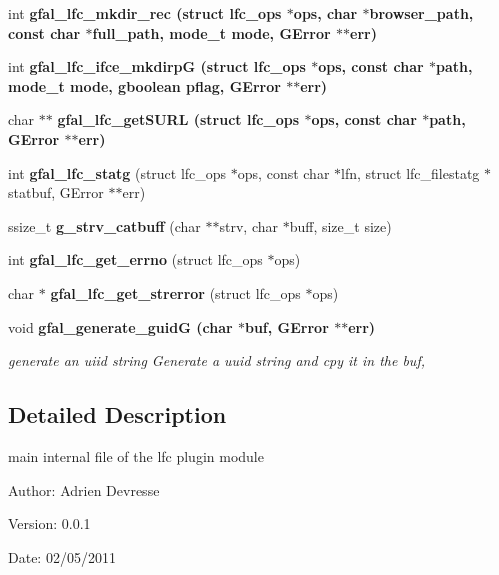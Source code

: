 \begin{CompactItemize}
\item 
int \bf{gfal\_\-lfc\_\-mkdir\_\-rec} (struct lfc\_\-ops $\ast$ops, char $\ast$browser\_\-path, const char $\ast$full\_\-path, mode\_\-t mode, GError $\ast$$\ast$err)
\item 
int \bf{gfal\_\-lfc\_\-ifce\_\-mkdirp\-G} (struct lfc\_\-ops $\ast$ops, const char $\ast$path, mode\_\-t mode, gboolean pflag, GError $\ast$$\ast$err)
\item 
char $\ast$$\ast$ \bf{gfal\_\-lfc\_\-get\-SURL} (struct lfc\_\-ops $\ast$ops, const char $\ast$path, GError $\ast$$\ast$err)
\item 
int \textbf{gfal\_\-lfc\_\-statg} (struct lfc\_\-ops $\ast$ops, const char $\ast$lfn, struct lfc\_\-filestatg $\ast$statbuf, GError $\ast$$\ast$err)\label{lfc__ifce__ng_8c_220714510c3f197e656ddea9f04ffec3}

\item 
ssize\_\-t \textbf{g\_\-strv\_\-catbuff} (char $\ast$$\ast$strv, char $\ast$buff, size\_\-t size)\label{lfc__ifce__ng_8c_bc04cd8d7342170700f02f6297fc4105}

\item 
int \textbf{gfal\_\-lfc\_\-get\_\-errno} (struct lfc\_\-ops $\ast$ops)\label{lfc__ifce__ng_8c_caa53981228e722b2175cfd7b4ca051c}

\item 
char $\ast$ \textbf{gfal\_\-lfc\_\-get\_\-strerror} (struct lfc\_\-ops $\ast$ops)\label{lfc__ifce__ng_8c_58172b62403dfd7a7b742548f074cd44}

\item 
void \bf{gfal\_\-generate\_\-guid\-G} (char $\ast$buf, GError $\ast$$\ast$err)
\begin{CompactList}\small\item\em generate an uiid string Generate a uuid string and cpy it in the buf, \item\end{CompactList}\end{CompactItemize}


\subsection{Detailed Description}
main internal file of the lfc plugin module 

\begin{Desc}
\item[Author:]Adrien Devresse \end{Desc}
\begin{Desc}
\item[Version:]0.0.1 \end{Desc}
\begin{Desc}
\item[Date:]02/05/2011 \end{Desc}


